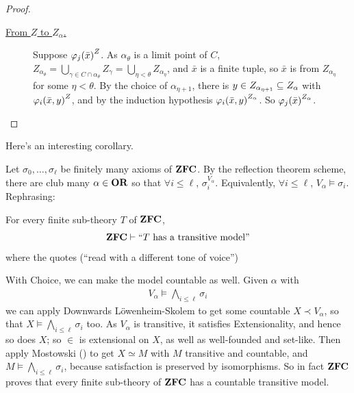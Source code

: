 \begin{proof}
\begin{description}
        \item[\underline{From $Z$ to $Z_{\alpha}$.}] Suppose $\varphi_j\!\left( \bar{x} \right)^Z$. As $\alpha_{\theta}$ is a limit point of $C$, $Z_{\alpha_{\theta}} = \bigcup_{\gamma \in C \cap \alpha_{\theta}} Z_{\gamma} = \bigcup_{\eta < \theta} Z_{\alpha_{\eta}}$, and $\bar{x}$ is a finite tuple, so $\bar{x}$ is from $Z_{\alpha_{\eta}}$ for some $\eta < \theta$. By the choice of $\alpha_{\eta + 1}$, there is $y \in Z_{\alpha_{\eta + 1}} \subseteq Z_{\alpha}$ with $\varphi_i\!\left( \bar{x}, y \right)^Z$, and by the induction hypothesis $\varphi_i\!\left( \bar{x}, y \right)^{Z_{\alpha}}$. So $\varphi_j\!\left( \bar{x} \right)^{Z_{\alpha}}$.
    \end{description}
\end{proof}

Here's an interesting corollary.

Let $\sigma_0, \ldots, \sigma_{\ell}$ be finitely many axioms of $\mathbf{ZFC}$. By the reflection theorem scheme, there are club many $\alpha \in \mathbf{OR}$ so that $\forall  i \leq \ell$, $\sigma_i^{V_{\alpha}}$. Equivalently, $\forall i \leq \ell$, $V_{\alpha} \models \sigma_i$. Rephrasing:

\begin{boxcorollary}
    For every finite sub-theory $T$ of $\mathbf{ZFC}$,
    \begin{align*}
        \mathbf{ZFC} \vdash \text{``$T$ has a transitive model''}
    \end{align*}
    where the quotes (``read with a different tone of voice'')
\end{boxcorollary}

With Choice, we can make the model countable as well. Given $\alpha$ with
\begin{align*}
    V_{\alpha} \models \bigwedge_{i \leq \ell} \sigma_i
\end{align*}
we can apply Downwards Löwenheim-Skolem to get some countable $X \prec V_{\alpha}$, so that $X \models \bigwedge_{i \leq \ell} \sigma_i$ too. As $V_{\alpha}$ is transitive, it satisfies Extensionality, and hence so does $X$; so $\in$ is extensional on $X$, as well as well-founded and set-like. Then apply Mostowski () to get $X \simeq M$ with $M$ transitive and countable, and $M \models \bigwedge_{i \leq \ell} \sigma_i$, because satisfaction is preserved by isomorphisms. So in fact $\mathbf{ZFC}$ proves that every finite sub-theory of $\mathbf{ZFC}$ has a countable transitive model.
